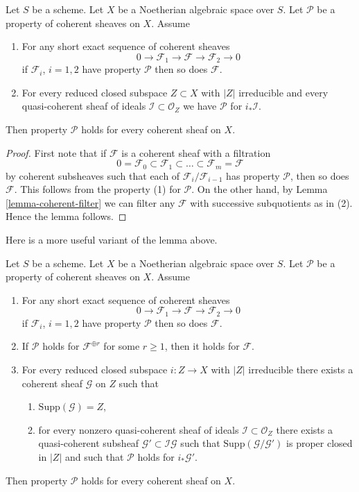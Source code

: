 \begin{lemma}
\label{lemma-property-initial}
Let $S$ be a scheme. Let $X$ be a Noetherian algebraic space over $S$.
Let $\mathcal{P}$ be a property of coherent sheaves on $X$. Assume
\begin{enumerate}
\item For any short exact sequence of coherent sheaves
$$
0 \to \mathcal{F}_1 \to \mathcal{F} \to \mathcal{F}_2 \to 0
$$
if $\mathcal{F}_i$, $i = 1, 2$ have property $\mathcal{P}$
then so does $\mathcal{F}$.
\item For every reduced closed subspace $Z \subset X$ with $|Z|$ irreducible
and every quasi-coherent sheaf of ideals $\mathcal{I} \subset \mathcal{O}_Z$
we have $\mathcal{P}$ for $i_*\mathcal{I}$.
\end{enumerate}
Then property $\mathcal{P}$ holds for every coherent sheaf on $X$.
\end{lemma}

\begin{proof}
First note that if $\mathcal{F}$ is a coherent sheaf with a filtration
$$
0 = \mathcal{F}_0 \subset \mathcal{F}_1 \subset
\ldots \subset \mathcal{F}_m = \mathcal{F}
$$
by coherent subsheaves such that each of $\mathcal{F}_i/\mathcal{F}_{i - 1}$
has property $\mathcal{P}$, then so does $\mathcal{F}$.
This follows from the property (1) for $\mathcal{P}$.
On the other hand, by Lemma \ref{lemma-coherent-filter}
we can filter any $\mathcal{F}$
with successive subquotients as in (2).
Hence the lemma follows.
\end{proof}

\noindent
Here is a more useful variant of the lemma above.

\begin{lemma}
\label{lemma-property-higher-rank-cohomological}
Let $S$ be a scheme. Let $X$ be a Noetherian algebraic space over $S$.
Let $\mathcal{P}$ be a property of coherent sheaves on $X$. Assume
\begin{enumerate}
\item For any short exact sequence of coherent sheaves
$$
0 \to \mathcal{F}_1 \to \mathcal{F} \to \mathcal{F}_2 \to 0
$$
if $\mathcal{F}_i$, $i = 1, 2$ have property $\mathcal{P}$
then so does $\mathcal{F}$.
\item If $\mathcal{P}$ holds for $\mathcal{F}^{\oplus r}$ for
some $r \geq 1$, then it holds for $\mathcal{F}$.
\item For every reduced closed subspace $i : Z \to X$ with
$|Z|$ irreducible there exists a coherent sheaf $\mathcal{G}$ on $Z$
such that
\begin{enumerate}
\item $\text{Supp}(\mathcal{G}) = Z$,
\item for every nonzero quasi-coherent sheaf of ideals
$\mathcal{I} \subset \mathcal{O}_Z$ there exists a quasi-coherent
subsheaf $\mathcal{G}' \subset \mathcal{I}\mathcal{G}$ such that
$\text{Supp}(\mathcal{G}/\mathcal{G}')$ is proper closed in $|Z|$
and such that $\mathcal{P}$ holds for $i_*\mathcal{G}'$.
\end{enumerate}
\end{enumerate}
Then property $\mathcal{P}$ holds for every coherent sheaf on $X$.
\end{lemma}

